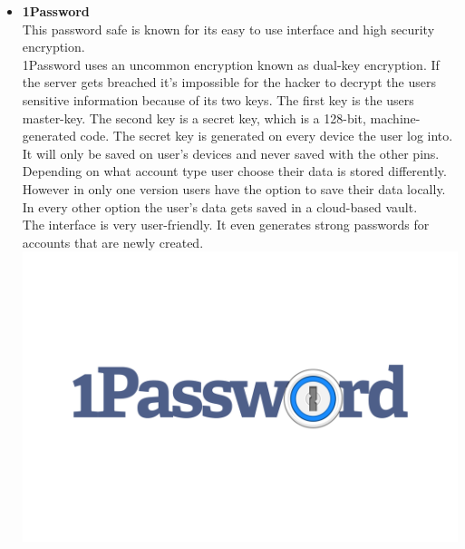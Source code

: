 \documentclass[conference]{IEEEtran}
\begin{document}
\begin{itemize}
\item \textbf{1Password}\cite{b7}\\
This password safe is known for its easy to use interface and high security encryption.\\ 
1Password uses an uncommon encryption known as dual-key encryption. If the server gets breached it's impossible for the hacker to decrypt the users sensitive information because of its two keys. The first key is the users master-key. The second key is a secret key, which is a 128-bit, machine-generated code. The secret key is generated on every device the user log into. It will only be saved on user's devices and never saved with the other pins.\\
Depending on what account type user choose their data is stored differently. However in only one version users have the option to save their data locally. In every other option the user's data gets saved in a cloud-based vault.\\
The interface is very user-friendly. It even generates strong passwords for accounts that are newly created.
\includegraphics[scale=0.077]{./images/1Password-Logo.wine.png}\\
\end{itemize}
\end{document}
